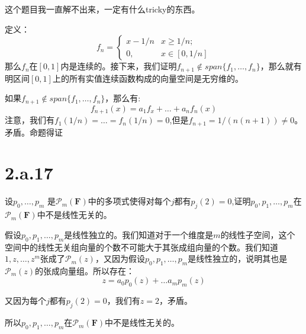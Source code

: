 \documentclass[10pt,a4paper,UTF8]{article}
\begin{document}
\begin{answer}
这个题目我一直解不出来，一定有什么tricky的东西。

定义：
\begin{equation}
\label{eq:14}
f_{n} =
\begin{cases}
x-1/n & x \geq 1/n; \\
0, & x\in [0,1/n]
\end{cases}
\end{equation}
那么\(f_{n}\)在\([0,1]\)内是连续的。接下来，我们证明\(f_{n+1}\notin span \{f_{1},\ldots ,f_{n}\}\)，那么就有明区间\([0,1]\)上的所有实值连续函数构成的向量空间是无穷维的。

如果\(f_{n+1}\notin span \{f_{1},\ldots ,f_{n}\}\)，那么有:
\begin{equation}
\label{eq:15}
f_{n+1}(x) = a_{1}f_{x} + \ldots + a_{n}f_{n}(x)
\end{equation}
注意，我们有\(f_{1}(1/n) = \ldots = f_{n}(1/n)=0\),但是\(f_{n+1} = 1/(n(n+1)) \neq 0\)。矛盾。命题得证
\end{answer}

\section*{2.a.17}
\label{sec:org502968f}


\begin{problem}
设\(p_{0},\ldots ,p_{m}\) 是\(\mathcal{P}_{m}(\mathbf{F})\)中的多项式使得对每个\(j\)都有\(p_{j}(2) = 0\),证明\(p_{0},p_{1},\ldots ,p_{m}\)在\(\mathcal{P}_{m}(\mathbf{F})\)中不是线性无关的。
\end{problem}

\begin{answer}
假设\(p_{0},p_{1},\ldots ,p_{m}\)是线性独立的。我们知道对于一个维度是\(m\)的线性子空间，这个空间中的线性无关组向量的个数不可能大于其张成组向量的个数。我们知道\(1,z,\ldots ,z^{m}\)张成了\(\mathcal{P}_{m}(z)\)，又因为假设\(p_{0},p_{1},\ldots ,p_{m}\)是线性独立的，说明其也是\(\mathcal{P}_{m}(z)\)的张成向量组。所以存在：
\begin{equation}
\label{eq:16}
z = a_{0}p_{0}(z) + \ldots a_{m}p_{m}(z)
\end{equation}

又因为每个\(j\)都有\(p_{j}(2) = 0\)，我们有\(z=2\)，矛盾。

所以\(p_{0},p_{1},\ldots ,p_{m}\)在\(\mathcal{P}_{m}(\mathbf{F})\)中不是线性无关的。
\end{answer}
\end{document}
